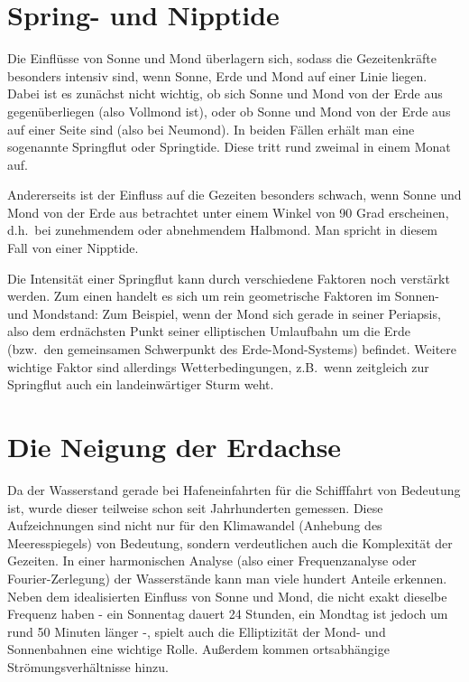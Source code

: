 \section{Spring- und Nipptide}

Die Einfl\"usse 
von Sonne und Mond \"uberlagern sich, sodass die Gezeitenkr\"afte besonders
intensiv sind, wenn Sonne, Erde und Mond auf einer Linie liegen. Dabei ist es zun\"achst nicht
wichtig, ob sich Sonne und Mond von der Erde aus gegen\"uberliegen (also Vollmond ist), oder
ob Sonne und Mond von der Erde aus auf einer Seite sind (also bei Neumond). In beiden F\"allen
erh\"alt man eine sogenannte Springflut oder Springtide. Diese tritt rund zweimal in einem Monat
auf. 

Andererseits ist der Einfluss auf die Gezeiten besonders schwach, wenn Sonne und Mond von der
Erde aus betrachtet unter einem Winkel von 90 Grad erscheinen, d.h.\ bei zunehmendem oder
abnehmendem Halbmond. Man spricht in diesem Fall von einer Nipptide. 

Die Intensit\"at einer Springflut kann durch verschiedene Faktoren noch verst\"arkt werden. Zum einen
handelt es sich um rein geometrische Faktoren im Sonnen- und Mondstand: Zum Beispiel, wenn
der Mond sich gerade in seiner Periapsis, also dem erdn\"achsten Punkt seiner elliptischen 
Umlaufbahn um die Erde (bzw.\ den gemeinsamen Schwerpunkt des Erde-Mond-Systems) befindet. 
Weitere wichtige Faktor sind allerdings Wetterbedingungen, z.B.\ wenn zeitgleich zur Springflut
auch ein landeinw\"artiger Sturm weht. 

\section{Die Neigung der Erdachse}

Da der Wasserstand gerade bei Hafeneinfahrten f\"ur die Schifffahrt von Bedeutung ist, wurde
dieser teilweise schon seit Jahrhunderten gemessen. Diese Aufzeichnungen sind nicht nur f\"ur
den Klimawandel (Anhebung des Meeresspiegels) von Bedeutung, sondern verdeutlichen
auch die Komplexit\"at der Gezeiten. 
In einer harmonischen Analyse (also einer Frequenzanalyse oder Fourier-Zerlegung) der Wasserst\"ande
kann man viele hundert Anteile erkennen. Neben dem idealisierten Einfluss von Sonne und Mond, die
nicht exakt dieselbe Frequenz haben - ein Sonnentag dauert 24 Stunden, ein Mondtag ist jedoch
um rund 50 Minuten l\"anger -, spielt auch die Elliptizit\"at der Mond- und Sonnenbahnen
eine wichtige Rolle. Au\ss erdem kommen ortsabh\"angige Str\"omungsverh\"altnisse hinzu. 

